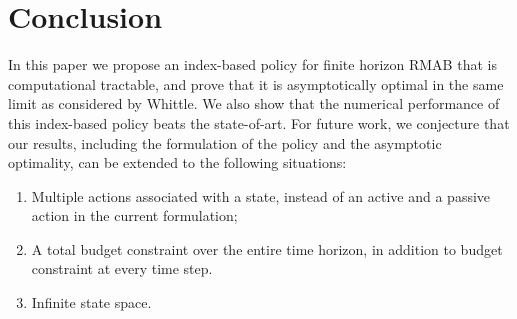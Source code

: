 \section{Conclusion}
In this paper we propose an index-based policy for finite horizon RMAB that is computational tractable, and prove that it is asymptotically optimal in the same limit as considered by Whittle. We also show that the numerical performance of this index-based policy beats the state-of-art. For future work, we conjecture that our results, including the formulation of the policy and the asymptotic optimality, can be extended to the following situations:
\begin{enumerate}
\item Multiple actions associated with a state, instead of an  active and a passive action in the current formulation;
\item A total budget constraint over the entire time horizon, in addition to budget constraint at every time step.
\item Infinite state space.
\end{enumerate}